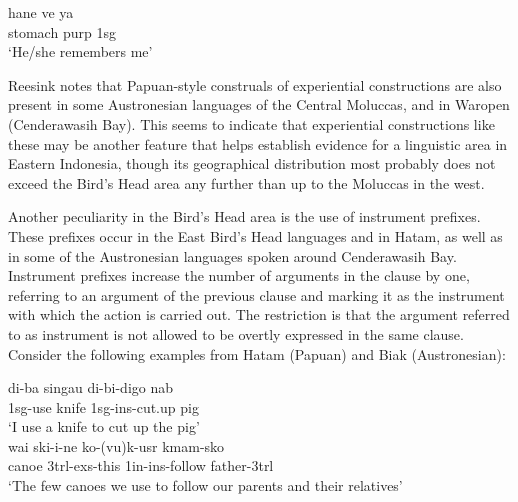 \ea 
\gll hane ve ya \\
stomach \acs{purp} \acs{1}\acs{sg} \\
\glft `He/she remembers me' \\ 
\endgl
\xe

Reesink notes that Papuan-style construals of experiential constructions are also present in some Austronesian languages of the Central Moluccas, and in Waropen (Cenderawasih Bay). This seems to indicate that experiential constructions like these may be another feature that helps establish evidence for a linguistic area in Eastern Indonesia, though its geographical distribution most probably does not exceed the Bird's Head area any further than up to the Moluccas in the west.

Another peculiarity in the Bird's Head area is the use of instrument prefixes. These prefixes occur in the East Bird's Head languages and in Hatam, as well as in some of the Austronesian languages spoken around Cenderawasih Bay. Instrument prefixes increase the number of arguments in the clause by one, referring to an argument of the previous clause and marking it as the instrument with which the action is carried out. The restriction is that the argument referred to as instrument is not allowed to be overtly expressed in the same clause. Consider the following examples from Hatam (Papuan) and Biak (Austronesian):

\ea \label{Hatam_ins}
\gll di-ba singau di-bi-digo nab \\
\acs{1}\acs{sg}-use knife \acs{1}\acs{sg}-\acs{ins}-cut.up pig \\
\glft `I use a knife to cut up the pig' \\ 
\endgl
\xe
\ea \label{Biak_ins}
\gll wai ski-i-ne ko-(vu)k-usr kmam-sko \\
canoe \acs{3}\acs{trl}-\acs{exs}-this \acs{1}\acs{in}-\acs{ins}-follow father-\acs{3}\acs{trl} \\
\glft `The few canoes we use to follow our parents and their relatives' \\ 
\endgl
\xe


